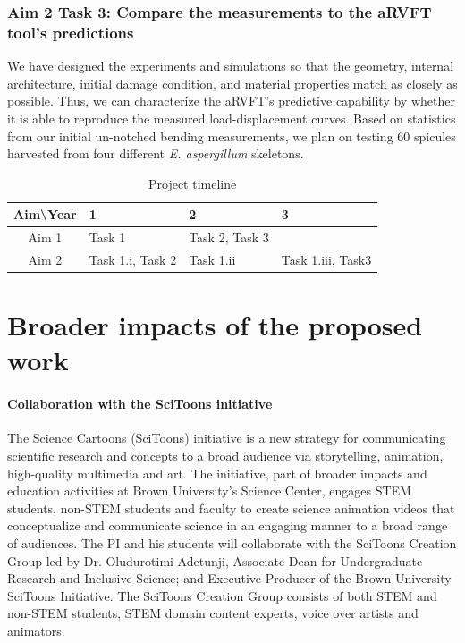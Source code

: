 \documentclass[10pt,letterpaper]{article}
\begin{document}
    \subsubsection{Aim 2 Task 3: Compare the measurements to the aRVFT tool's predictions}
      We have designed the experiments and simulations so that the geometry, internal architecture, initial damage condition, and material properties match as closely as possible. Thus, we can characterize the aRVFT's predictive capability by whether it is able to reproduce the measured load-displacement curves. Based on statistics from our initial un-notched bending measurements, we plan on testing 60 spicules harvested from four different \textit{E. aspergillum} skeletons.
%
      \begin{table}[H]
        \center
        \caption{Project timeline}
        \label{t:timeline}
        \begin{tabular}{clll}
          \hline
          Aim\textbackslash Year & 1 &  2 &  3 \\
          \hline
          Aim 1 & Task 1 & Task 2, Task 3 &  \\
          Aim 2 & Task 1.i, Task 2 & Task 1.ii & Task 1.iii, Task3 \\
          \hline
        \end{tabular}
      \end{table}

\section{Broader impacts of the proposed work}
  \label{s:broaderimp}
  \paragraph{Collaboration with the SciToons initiative}
    The Science Cartoons (SciToons) initiative is a new strategy for communicating scientific research and concepts to a broad audience via storytelling, animation, high-quality multimedia and art. The initiative, part of broader impacts and education activities at Brown University's Science Center, engages STEM students, non-STEM students and faculty to create science animation videos that conceptualize and communicate science in an engaging manner to a broad range of audiences. The PI and his students will collaborate with the SciToons Creation Group led by Dr. Oludurotimi Adetunji, Associate Dean for Undergraduate Research and Inclusive Science; and Executive Producer of the Brown University SciToons Initiative. The SciToons Creation Group consists of both STEM and non-STEM students, STEM domain content experts, voice over artists and animators.
\end{document}
